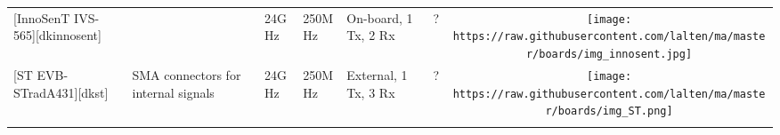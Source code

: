 \begin{longtable}[]{@{}llllllc@{}}
\begin{minipage}[t]{0.09\columnwidth}
{[}InnoSenT IVS-565{]}{[}dkinnosent{]}\strut
\end{minipage} & \begin{minipage}[t]{0.13\columnwidth}\raggedright\strut
\strut
\end{minipage} & \begin{minipage}[t]{0.09\columnwidth}\raggedright\strut
24GHz\strut
\end{minipage} & \begin{minipage}[t]{0.11\columnwidth}\raggedright\strut
250MHz\strut
\end{minipage} & \begin{minipage}[t]{0.10\columnwidth}\raggedright\strut
On-board, 1 Tx, 2 Rx\strut
\end{minipage} & \begin{minipage}[t]{0.15\columnwidth}\raggedright\strut
?\strut
\end{minipage} & \begin{minipage}[t]{0.10\columnwidth}\centering\strut
\texttt{[image: https://raw.githubusercontent.com/lalten/ma/master/boards/img\_innosent.jpg]}\strut
\end{minipage}\tabularnewline
\begin{minipage}[t]{0.09\columnwidth}\raggedright\strut
{[}ST EVB-STradA431{]}{[}dkst{]}\strut
\end{minipage} & \begin{minipage}[t]{0.13\columnwidth}\raggedright\strut
SMA connectors for internal signals\strut
\end{minipage} & \begin{minipage}[t]{0.09\columnwidth}\raggedright\strut
24GHz\strut
\end{minipage} & \begin{minipage}[t]{0.11\columnwidth}\raggedright\strut
250MHz\strut
\end{minipage} & \begin{minipage}[t]{0.10\columnwidth}\raggedright\strut
External, 1 Tx, 3 Rx\strut
\end{minipage} & \begin{minipage}[t]{0.15\columnwidth}\raggedright\strut
?\strut
\end{minipage} & \begin{minipage}[t]{0.10\columnwidth}\centering\strut
\texttt{[image: https://raw.githubusercontent.com/lalten/ma/master/boards/img\_ST.png]}\strut
\end{minipage}\tabularnewline
\begin{minipage}[t]{0.09\columnwidth}\raggedright\strut

\end{minipage}
\end{longtable}

